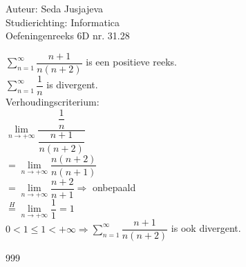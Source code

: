 \documentclass[a4paper]{article}
\newcommand{\limit}{\lim\limits}
\begin{document}
\noindent \large Auteur: Seda Jusjajeva\\
\noindent \large Studierichting: Informatica\\
\noindent \large Oefeningenreeks 6D nr. 31.28\\

\medskip

\normalsize


$\displaystyle\sum_{n = 1}^{\infty}\dfrac{n + 1}{n(n + 2)}$ is een positieve reeks. \\

$\displaystyle\sum_{n = 1}^{\infty}\dfrac{1}{n}$ is divergent. \\

Verhoudingscriterium: \\

$\limit_{n \to +\infty} \dfrac{\dfrac{1}{n}}{\dfrac{n + 1}{n(n + 2)}}$ \\ 

$= \limit_{n \to +\infty} \dfrac{n(n + 2)}{n(n + 1)}$ \\

$= \limit_{n \to +\infty} \dfrac{n + 2}{n + 1} \Rightarrow$ onbepaald \\

$\overset{H} = \lim\limits_{n \to +\infty} \dfrac{1}{1} = 1$ \\

$0 < 1 \leq 1 < +\infty \Rightarrow  \displaystyle\sum_{n = 1}^{\infty}\dfrac{n + 1}{n(n + 2)}$ is ook divergent. \\


\begin{thebibliography}{999}
\end{thebibliography}
\end{document}
